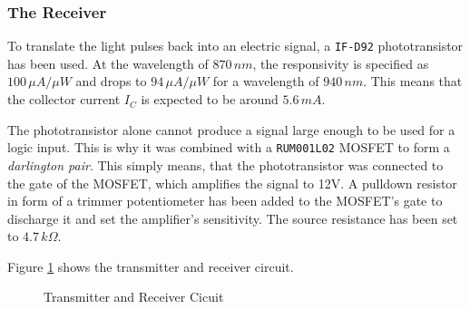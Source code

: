 \subsubsection{The Receiver}

To translate the light pulses back into an electric signal, a \texttt{IF-D92} phototransistor has been used. At the wavelength of \(870\,nm\), the responsivity is specified as \(100\,\mu A/\mu W\) and drops to \(94\,\mu A/\mu W\) for a wavelength of \(940\,nm\). This means that the collector current \(I_C\) is expected to be around \(5.6\,mA\).

The phototransistor alone cannot produce a signal large enough to be used for a logic input. This is why it was combined with a \texttt{RUM001L02} MOSFET to form a \emph{darlington pair}. This simply means, that the phototransistor was connected to the gate of the MOSFET, which amplifies the signal to 12V. A pulldown resistor in form of a trimmer potentiometer has been added to the MOSFET's gate to discharge it and set the amplifier's sensitivity. The source resistance has been set to \(4.7\,k\Omega\).

Figure \ref{fig:transmitter-receiver} shows the transmitter and receiver circuit.

\begin{figure}[h!]
    \centering
    \caption{Transmitter and Receiver Cicuit}
    \label{fig:transmitter-receiver}
\end{figure}

